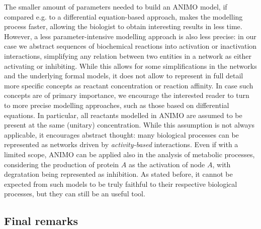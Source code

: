 \documentclass{bmcart}
\begin{document}
The smaller amount of parameters needed to build an ANIMO model, if compared e.g. to
a differential equation-based approach, makes the modelling process faster, allowing
the biologist to obtain interesting results in less time. However, a less
parameter-intensive modelling approach is also less precise: in our case we abstract
sequences of biochemical reactions into activation or inactivation interactions,
simplifying any relation between two entities in a network as either activating or
inhibiting. While this allows for some simplifications in the networks and the underlying
formal models, it does not allow to represent in full detail more specific concepts
as reactant concentration or reaction affinity. In case such concepts are of
primary importance, we encourage the interested reader to turn to more precise
modelling approaches, such as those based on differential equations.
In particular, all reactants modelled in ANIMO are assumed to be present at the same
(unitary) concentration. While this assumption is not always applicable, it encourages
abstract thought: many biological processes can be represented as networks driven by
\emph{activity-based} interactions. Even if with a limited scope, ANIMO can be applied
also in the analysis of metabolic processes, considering the production of protein $A$ as
the activation of node $A$, with degratation being represented as inhibition. As stated before,
it cannot be expected from such models to be truly faithful to their respective biological
processes, but they can still be an useful tool.



\subsection*{Final remarks}
% 
% 
\end{document}
